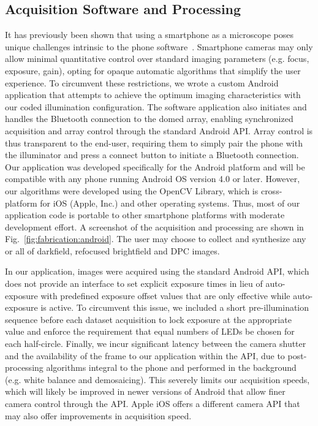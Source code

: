 \subsection{Acquisition Software and Processing}
It has previously been shown that using a smartphone as a microscope poses unique challenges intrinsic to the phone software~\cite{skandarajah2014quantitative}. Smartphone cameras may only allow minimal quantitative control over standard imaging parameters (e.g. focus, exposure, gain), opting for opaque automatic algorithms that simplify the user experience. To circumvent these restrictions, we wrote a custom Android application that attempts to achieve the optimum imaging characteristics with our coded illumination configuration. The software application also initiates and handles the Bluetooth connection to the domed array, enabling synchronized acquisition and array control through the standard Android API. Array control is thus transparent to the end-user, requiring them to simply pair the phone with the illuminator and press a connect button to initiate a Bluetooth connection. Our application was developed specifically for the Android platform and will be compatible with any phone running Android OS version 4.0 or later. However, our algorithms were developed using the OpenCV Library, which is cross-platform for iOS (Apple, Inc.) and other operating systems. Thus, most of our application code is portable to other smartphone platforms with moderate development effort. A screenshot of the acquisition and processing are shown in Fig.~\ref{fig:fabrication:android}. The user may choose to collect and synthesize any or all of darkfield, refocused brightfield and DPC images.

In our application, images were acquired using the standard Android API, which does not provide an interface to set explicit exposure times in lieu of auto-exposure with predefined exposure offset values that are only effective while auto-exposure is active. To circumvent this issue, we included a short pre-illumination sequence before each dataset acquisition to lock exposure at the appropriate value and enforce the requirement that equal numbers of LEDs be chosen for each half-circle. Finally, we incur significant latency between the camera shutter and the availability of the frame to our application within the API, due to post-processing algorithms integral to the phone and performed in the background (e.g. white balance and demosaicing). This severely limits our acquisition speeds, which will likely be improved in newer versions of Android that allow finer camera control through the API. Apple iOS offers a different camera API that may also offer improvements in acquisition speed.


